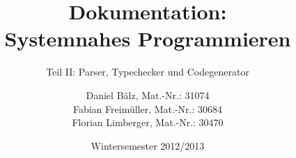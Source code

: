 \documentclass[a4paper,titlepage,12pt]{scrreprt}
\begin{document}
\titlehead{
	\texttt{[image: hska\_logo]}
}

\title{Dokumentation: \\ Systemnahes Programmieren}
\subtitle{Teil II: Parser, Typechecker und Codegenerator}
\author{%
	Daniel Bälz, Mat.-Nr.: 31074 \\
	Fabian Freimüller, Mat.-Nr.: 30684 \\
	Florian Limberger, Mat.-Nr.: 30470
}
\date{Wintersemester 2012/2013}
\publishers{
    \textbf{Betreuer:} Prof.\,Dr. Thomas Fuchß
}
\maketitle

\tableofcontents

\clearpage





\end{document}
